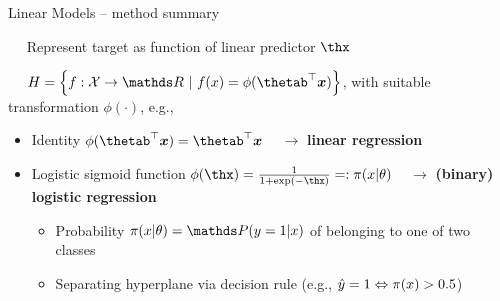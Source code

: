 \begin{vbframe}{Linear Models -- method summary}

   
\medskip

 ~~ Represent target as function of linear predictor
$\thx$

\medskip

 ~~
$\Hspace = \left\{f: \Xspace \to \R ~|~\fx = \phi(\thetab^\top \xv)\right\}$, 
with suitable transformation $\phi(\cdot)$, e.g.,

\begin{itemize}
  \item Identity $\phi(\thetab^\top \xv) = \thetab^\top \xv$ 
  ~ $\rightarrow$ \textbf{linear regression}
  \item Logistic sigmoid function $\phi(\thx) = \frac{1}{1 + \exp(- \thx)} 
  =: \pixt$
  ~ $\rightarrow$ \textbf{(binary) logistic regression}
  \begin{itemize}
    
    \item Probability $\pixt = \post$ of belonging to one of two classes
    \item Separating hyperplane via decision rule 
    (e.g., $\hat{y} = 1 \Leftrightarrow \pi(x) > 0.5$)
  \end{itemize}
\end{itemize}


\end{vbframe}
